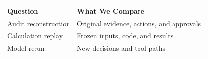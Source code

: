 \begin{tabular}{@{}P{4.0cm}P{8.5cm}@{}}
\toprule
\textbf{Question} & \textbf{What We Compare} \\
\midrule
Audit reconstruction & Original evidence, actions, and approvals \\
Calculation replay & Frozen inputs, code, and results \\
Model rerun & New decisions and tool paths \\
\bottomrule
\end{tabular}
